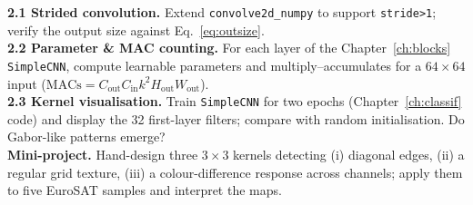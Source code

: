 \begin{exbox}
\textbf{2.1 Strided convolution.} Extend \texttt{convolve2d\_numpy} to support
\texttt{stride>1}; verify the output size against Eq.~\eqref{eq:outsize}.\\[2pt]
\textbf{2.2 Parameter \& MAC counting.} For each layer of the
Chapter~\ref{ch:blocks} \texttt{SimpleCNN}, compute learnable parameters and
multiply--accumulates for a $64\times64$ input
($\text{MACs}=C_\mathrm{out}C_\mathrm{in}k^2 H_\mathrm{out}W_\mathrm{out}$).\\[2pt]
\textbf{2.3 Kernel visualisation.} Train \texttt{SimpleCNN} for two epochs
(Chapter~\ref{ch:classif} code) and display the 32 first-layer filters; compare
with random initialisation. Do Gabor-like patterns emerge?\\[2pt]
\textbf{Mini-project.} Hand-design three $3\times3$ kernels detecting (i)
diagonal edges, (ii) a regular grid texture, (iii) a colour-difference response
across channels; apply them to five EuroSAT samples and interpret the maps.
\end{exbox}
